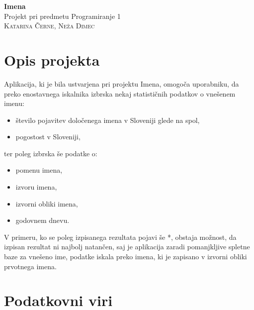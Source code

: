\documentclass[a4paper, 12pt]{article}
\begin{document}
\begin{center}
{\huge\textbf{Imena}}\\
{\large{Projekt pri predmetu Programiranje 1}}\\
{\large\textsc{Katarina Černe, Neža Dimec}}
\end{center}

\tableofcontents

\section{Opis projekta}

Aplikacija, ki je bila ustvarjena pri projektu Imena, omogoča uporabniku, da preko enostavnega iskalnika izbrska nekaj statističnih podatkov o vnešenem imenu:

\begin{itemize}
\item število pojavitev določenega imena v Sloveniji glede na spol,
\item pogostost v Sloveniji,
\end{itemize}

\noindent ter poleg izbrska še podatke o:

\begin{itemize}
\item pomenu imena,
\item izvoru imena,
\item izvorni obliki imena,
\item godovnem dnevu.
\end{itemize}

V primeru, ko se poleg izpisanega rezultata pojavi še *, obstaja možnost, da izpisan rezultat ni najbolj natančen, saj je aplikacija zaradi pomanjkljive spletne baze za vnešeno ime, podatke iskala preko imena, ki je zapisano v izvorni obliki prvotnega imena.

\section{Podatkovni viri}
\end{document}
